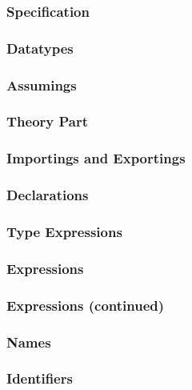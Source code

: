 \subsubsection*{Specification}
\par\noindent
{}

\subsubsection*{Datatypes}
\par\noindent
{}

\subsubsection*{Assumings}
\par\noindent
{}

\subsubsection*{Theory Part}
\par\noindent
{}

\subsubsection*{Importings and Exportings}
\par\noindent
{}

\subsubsection*{Declarations}
\par\noindent
{}

\subsubsection*{Type Expressions}
\par\noindent
{}

\subsubsection*{Expressions}
\par\noindent
{}

\subsubsection*{Expressions (continued)}
\par\noindent
{}

\subsubsection*{Names}
\par\noindent
{}

\subsubsection*{Identifiers}
\par\noindent
{}
